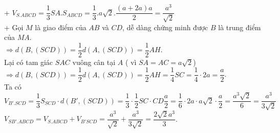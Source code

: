 \begin{ex}
{\begin{center}
		\end{center}
		+ ${V_{S.ABCD}}=\dfrac{1}{3}SA.{S_{ABCD}}=\dfrac{1}{3}.a\sqrt{2}.\dfrac{\left( a+2a \right)a}{2}=\dfrac{a^3}{\sqrt{2}}$\\
		+ Gọi $M$ là giao điểm của $AB$ và $CD$, dễ dàng chứng minh được $B$ là trung điểm của $MA$.\\
		$\Rightarrow d\left( B,\left( SCD \right) \right)=\dfrac{1}{2}d\left( A,\left( SCD \right) \right)=\dfrac{1}{2}AH$.\\
		Lại có tam giác $SAC$ vuông cân tại $A$ ( vì $SA=AC=a\sqrt{2}$)\\
		$\Rightarrow d\left( B,\left( SCD \right) \right)=\dfrac{1}{2}d\left( A,\left( SCD \right) \right)=\dfrac{1}{2}AH=\dfrac{1}{4}SC=\dfrac{1}{4}\cdot 2a=\dfrac{a}{2}$.\\
		Ta có $ {V_{B'.SCD}}=\dfrac{1}{3}{S_{SCD}}\cdot d\left( B',\left( SCD \right) \right)=\dfrac{1}{3}\cdot\dfrac{1}{2}SC\cdot CD\dfrac{a}{2}=\dfrac{1}{6}\cdot 2a\cdot a\sqrt{2}\cdot\dfrac{a}{2}=\dfrac{a^3\sqrt{2}}{6}=\dfrac{a^3}{3\sqrt{2}}$\\
		${V_{SB'.ABCD}}={V_{S.ABCD}}+{V_{B'SCD}}=\dfrac{a^3}{\sqrt{2}}+\dfrac{a^3}{3\sqrt{2}}=\dfrac{2\sqrt{2}{a^3}}{3}$.}
\end{ex}
